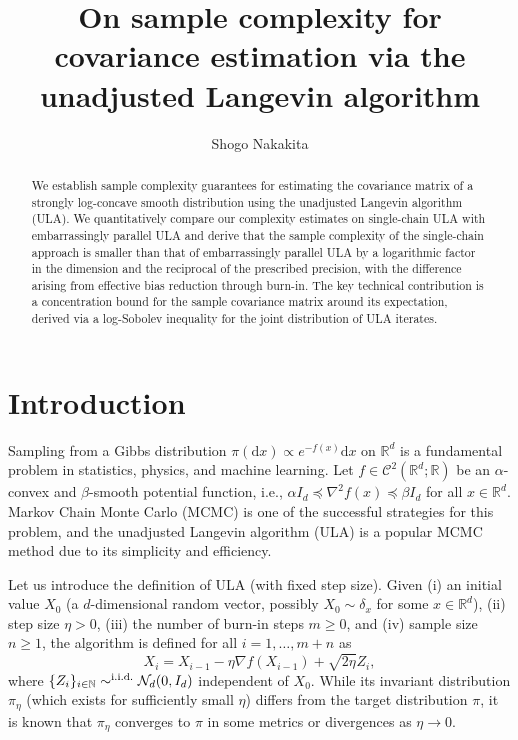 \documentclass[12pt,reqno]{amsart}
\title[Covariance estimation via ULA]{On sample complexity for covariance estimation via the unadjusted Langevin algorithm}
\author[S Nakakita]{Shogo Nakakita}
\theoremstyle{remark}
\theoremstyle{definition}
\newcommand{\calC}{\mathcal{C}}
\newcommand{\calN}{\mathcal{N}}
\newcommand{\N}{\mathbb{N}}
\newcommand{\R}{\mathbb{R}}
\newcommand{\iid}{\textnormal{i.i.d.}}
\newcommand{\diff}{\mathrm{d}}
\begin{document}
\begin{abstract}
    We establish sample complexity guarantees for estimating the covariance matrix of a strongly log-concave smooth distribution using the unadjusted Langevin algorithm (ULA).
    We quantitatively compare our complexity estimates on single-chain ULA with embarrassingly parallel ULA and derive that the sample complexity of the single-chain approach is smaller than that of embarrassingly parallel ULA by a logarithmic factor in the dimension and the reciprocal of the prescribed precision, with the difference arising from effective bias reduction through burn-in.
    The key technical contribution is a concentration bound for the sample covariance matrix around its expectation, derived via a log-Sobolev inequality for the joint distribution of ULA iterates.
\end{abstract}

\maketitle

\section{Introduction}\label{sec:intro}
Sampling from a Gibbs distribution $\pi(\diff x)\propto e^{-f(x)}\diff x$ on $\R^{d}$ is a fundamental problem in statistics, physics, and machine learning.
Let $f\in\calC^{2}(\R^{d};\R)$ be an $\alpha$-convex and $\beta$-smooth potential function, i.e., $\alpha I_{d}\preceq\nabla^{2}f(x)\preceq\beta I_{d}$ for all $x\in\R^{d}$.
Markov Chain Monte Carlo (MCMC) is one of the successful strategies for this problem, and the unadjusted Langevin algorithm (ULA) is a popular MCMC method due to its simplicity and efficiency.

Let us introduce the definition of ULA (with fixed step size). Given (i) an initial value $X_{0}$ (a $d$-dimensional random vector, possibly $X_{0}\sim \delta_{x}$ for some $x\in\R^{d}$), (ii) step size $\eta>0$, (iii) the number of burn-in steps $m\ge0$, and (iv) sample size $n\ge1$, the algorithm is defined for all $i=1,\ldots,m+n$ as
\begin{equation}\label{eq:def:ula}
    X_{i}=X_{i-1}-\eta\nabla f(X_{i-1})+\sqrt{2\eta}Z_{i},
\end{equation}
where $\{Z_{i}\}_{i\in\N}\sim^{\iid} \calN_{d}(0,I_{d})$ independent of $X_{0}$.
While its invariant distribution $\pi_{\eta}$ (which exists for sufficiently small $\eta$) differs from the target distribution $\pi$, it is known that $\pi_{\eta}$ converges to $\pi$ in some metrics or divergences as $\eta\to0$.
\end{document}
